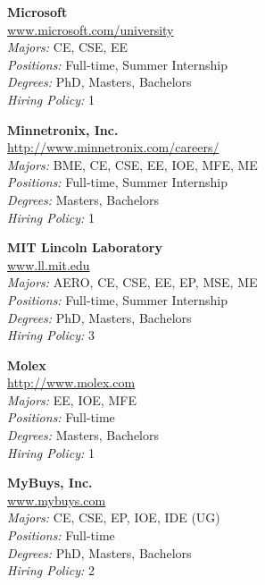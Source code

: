 \documentclass[twoside]{article}
\begin{document}
\begin{center}
\begin{multicols}{3}
\begin{minipage}{.9\columnwidth}{\Large\bf Microsoft }\\
	\url{www.microsoft.com/university}\\
	\emph{Majors:} CE, CSE, EE\\
	\emph{Positions:} Full-time, Summer Internship\\
	\emph{Degrees:} PhD, Masters, Bachelors\\
	\emph{Hiring Policy:} 1\\
\end{minipage}
 
\begin{minipage}{.9\columnwidth}{\Large\bf Minnetronix, Inc. }\\
	\url{http://www.minnetronix.com/careers/}\\
	\emph{Majors:} BME, CE, CSE, EE, IOE, MFE, ME\\
	\emph{Positions:} Full-time, Summer Internship\\
	\emph{Degrees:} Masters, Bachelors\\
	\emph{Hiring Policy:} 1\\
\end{minipage}
 
\begin{minipage}{.9\columnwidth}{\Large\bf MIT Lincoln Laboratory }\\
	\url{www.ll.mit.edu}\\
	\emph{Majors:} AERO, CE, CSE, EE, EP, MSE, ME\\
	\emph{Positions:} Full-time, Summer Internship\\
	\emph{Degrees:} PhD, Masters, Bachelors\\
	\emph{Hiring Policy:} 3\\
\end{minipage}
 
\begin{minipage}{.9\columnwidth}{\Large\bf Molex }\\
	\url{http://www.molex.com}\\
	\emph{Majors:} EE, IOE, MFE\\
	\emph{Positions:} Full-time\\
	\emph{Degrees:} Masters, Bachelors\\
	\emph{Hiring Policy:} 1\\
\end{minipage}
 
\begin{minipage}{.9\columnwidth}{\Large\bf MyBuys, Inc. }\\
	\url{www.mybuys.com}\\
	\emph{Majors:} CE, CSE, EP, IOE, IDE (UG)\\
	\emph{Positions:} Full-time\\
	\emph{Degrees:} PhD, Masters, Bachelors\\
	\emph{Hiring Policy:} 2\\
\end{minipage}
 

\end{multicols}
\end{center}
\end{document}
